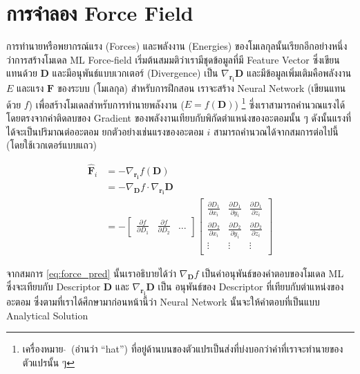 \section{การจำลอง Force Field}
\label{sec:model_ff}

การทำนายหรือพยากรณ์แรง (Forces) และพลังงาน (Energies) ของโมเลกุลนั้นเรียกอีกอย่างหนึ่งว่าการสร้างโมเดล ML Force-field 
เริ่มต้นสมมติว่าเรามีชุดข้อมูลที่มี Feature Vector ซึ่งเขียนแทนด้วย $\mathbf{D}$ และมีอนุพันธ์แบบเวกเตอร์ (Divergence) เป็น 
$\nabla_{\mathbf{r_i}} \mathbf{D}$ และมีข้อมูลเพิ่มเติมคือพลังงาน $E$ และแรง $\mathbf{F}$ ของระบบ (โมเลกุล) สำหรับการฝึกสอน
เราจะสร้าง Neural Network (เขียนแทนด้วย $f$) เพื่อสร้างโมเดลสำหรับการทำนายพลังงาน ($\hat{E} = f(\mathbf{D})$)%
\footnote{เครื่องหมาย $\hat{}$\, (อ่านว่า \enquote{hat}) ที่อยู่ด้านบนของตัวแปรเป็นส่งที่บ่งบอกว่าค่าที่เราจะทำนายของตัวแปรนั้น ๆ}
ซึ่งเราสามารถคำนวณแรงได้โดยตรงจากค่าติดลบของ Gradient ของพลังงานเทียบกับพิกัดตำแหน่งของอะตอมนั้น ๆ ดังนั้นแรงที่ได้จะเป็นปริมาณต่ออะตอม
ยกตัวอย่างเช่นแรงของอะตอม $i$ สามารถคำนวณได้จากสมการต่อไปนี้ (โดยใช้เวกเตอร์แบบแถว)

\begin{align}\label{eq:force_pred}
\hat{\mathbf{F}}_i &= - \nabla_{\mathbf{r_i}} f(\mathbf{D}) \\
&= - \nabla_{\mathbf{D}} f \cdot \nabla_{\mathbf{r_i}} \mathbf{D}\\
&= - \begin{bmatrix}
    \frac{\partial f}{\partial D_1} & \frac{\partial f}{\partial D_2} & \dots
\end{bmatrix}
\begin{bmatrix}
    \frac{\partial D_1}{\partial x_i} & \frac{\partial D_1}{\partial y_i} & \frac{\partial D_1}{\partial z_i}\\
    \frac{\partial D_2}{\partial x_i} & \frac{\partial D_2}{\partial y_i} & \frac{\partial D_2}{\partial z_i}\\
    \vdots & \vdots & \vdots \\
\end{bmatrix}
\end{align}

จากสมการ \ref{eq:force_pred} นั้นเราอธิบายได้ว่า $\nabla_{\mathbf{D}} f$ เป็นค่าอนุพันธ์ของคำตอบของโมเดล ML ซึ่งจะเทียบกับ
Descriptor $\mathbf{D}$ และ $\nabla_{\mathbf{r_i}} \mathbf{D}$ เป็น อนุพันธ์ของ Descriptor ที่เทียบกับตำแหน่งของอะตอม
ซึ่งตามที่เราได้ศึกษามาก่อนหน้านี้ว่า Neural Network นั้นจะให้คำตอบที่เป็นแบบ Analytical Solution

